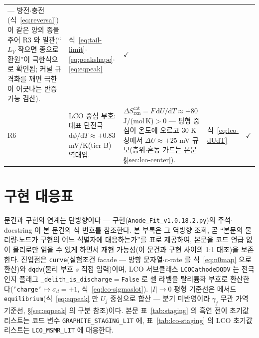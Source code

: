 \documentclass[11pt,a4paper]{article}
\newcommand{\dd}{\mathrm{d}}
\newcommand{\rxn}{\mathrm{rxn}}
\newcommand{\code}[1]{\texttt{#1}}
\begin{document}
\begin{longtable}{@{}l p{6.2cm} p{5.0cm} p{2.2cm} c@{}}
--- 방전$\cdot$충전(식~\eqref{eq:reversal})이 같은 양의 종을 주어 R3 와 일관(``$L_V$ 작으면 종으로 환원''이
극한식으로 확인됨; 커널 규격화를 깨면 극한이 어긋나는 반증 가능 검산).
& 식~\eqref{eq:tail-limit}$\cdot$ \eqref{eq:peakshape}$\cdot$ \eqref{eq:eqpeak} & $\checkmark$ \\
R6 & LCO 중심 부호: 대표 단전극 $\dd\phi/\dd T\approx+0.83$ mV/K(tier B)\cite{swiderska2019} 역대입.
& $\Delta S_{\rxn}^\mathrm{cat}=F\,\dd U/\dd T\approx+80$ J/(mol\,K)$>0$ --- 평형 중심이 온도에 오르고
$30$ K 창에서 $\Delta U\approx+25$ mV 규모(층위$\cdot$혼동 가드는 본문 \S\ref{sec:lco-center}).
& 식~\eqref{eq:lco-dUdT} & $\checkmark$ \\
\bottomrule
\end{longtable}

\section{구현 대응표}\label{sec:appendix-code}
문건과 구현의 연계는 단방향이다 --- 구현(\code{Anode\_Fit\_v1.0.18.2.py})의 주석$\cdot$docstring 이 본 문건의
식 번호를 참조한다. 본 부록은 그 역방향 조회, 곧 ``본문의 물리량$\cdot$노드가 구현의 어느 식별자에
대응하는가''를 표로 제공하여, 본문을 코드 언급 없이 물리로만 읽을 수 있게 하면서 재현 가능성(이 문건과
구현 사이의 1:1 대조)을 보존한다. 진입점은 \code{curve}(실험조건 facade — 방향 문자열$\cdot$c-rate 를
식~\eqref{eq:n0map} 으로 환산)와 \code{dqdv}(물리 부호 $s$ 직접 입력)이며, LCO 서브클래스
\code{LCOCathodeDQDV} 는 전극 인지 플래그 \code{\_delith\_is\_discharge}$=$\code{False} 로 셀 라벨을
탈리튬화 부호로 환산한다(\code{'charge'}$\mapsto\sigma_d{=}+1$, 식~\eqref{eq:lco-sigmaslot}). $|I|\to0$
평형 기준선은 메서드 \code{equilibrium}(식~\eqref{eq:eqpeak} 만 $U_j$ 중심으로 합산 — 분기
미반영이라 $\gamma_j$ 무관 가역 기준선, \S\ref{sec:eqpeak} 의 구분 참조)이다. 본문 표~\ref{tab:staging} 의
흑연 전이 초기값 리스트는 코드 변수 \code{GRAPHITE\_STAGING\_LIT} 에, 표~\ref{tab:lco-staging} 의 LCO
초기값 리스트는 \code{LCO\_MSMR\_LIT} 에 대응한다.
\end{document}
